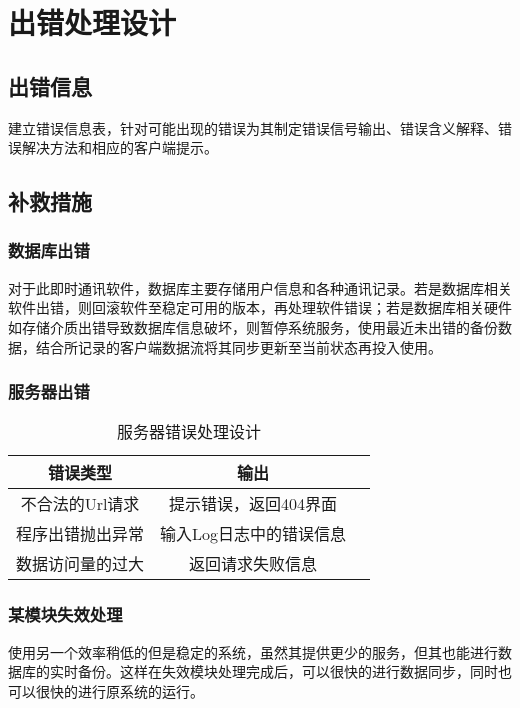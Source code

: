 \chapter{出错处理设计}
\section{出错信息}
建立错误信息表，针对可能出现的错误为其制定错误信号输出、错误含义解释、错误解决方法和相应的客户端提示。


\section{补救措施}
\subsection{数据库出错}
对于此即时通讯软件，数据库主要存储用户信息和各种通讯记录。若是数据库相关软件出错，则回滚软件至稳定可用的版本，再处理软件错误；若是数据库相关硬件如存储介质出错导致数据库信息破坏，则暂停系统服务，使用最近未出错的备份数据，结合所记录的客户端数据流将其同步更新至当前状态再投入使用。

\subsection{服务器出错}
\begin{table}[htbp]
	\centering
	\caption{服务器错误处理设计} \label{tab:server_error_handling_design}
	\begin{tabular}{|c|c|c|}
		\hline
		错误类型      & 输出 \\
		\hline
		不合法的Url请求 & 提示错误，返回404界面 \\
		\hline
		程序出错抛出异常 & 输入Log日志中的错误信息  \\
		\hline
		数据访问量的过大 & 返回请求失败信息 \\
		\hline
    \end{tabular}
\end{table}

\subsection{某模块失效处理}
使用另一个效率稍低的但是稳定的系统，虽然其提供更少的服务，但其也能进行数据库的实时备份。这样在失效模块处理完成后，可以很快的进行数据同步，同时也可以很快的进行原系统的运行。
